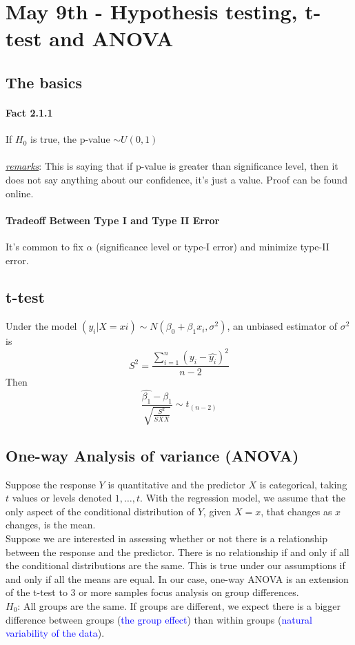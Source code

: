 \documentclass[11pt]{article}
\newcommand{\ti}[1]{\textit{#1}}
\newcommand{\under}[1]{\underline{#1}}
\begin{document}
\section{May 9th - Hypothesis testing, t-test and ANOVA}
\subsection{The basics}
\paragraph{Fact 2.1.1} If $H_0$ is true, the p-value $\sim U(0,1)$ \\\\
\under{\ti{remarks}}: This is saying that if p-value is greater than significance level, then it does not say anything about our confidence, it's just a value. Proof can be found online.
\paragraph{Tradeoff Between Type I and Type II Error}
It's common to fix $\alpha$ (significance level or type-I error) and minimize type-II error.
\subsection{t-test}
Under the model $(y_i|X=xi) \sim N(\beta_0 + \beta_1 x_i, \sigma^2)$, an unbiased estimator of $\sigma^2$ is 
$$S^2 = \frac{\sum_{i=1}^n(y_i-\hat{y_i})^2}{n-2} $$
Then
$$ \frac{\hat{\beta_1} - \beta_1}{\sqrt{\frac{S^2}{SXX}}} \sim t_{(n-2)}$$


\subsection{One-way Analysis of variance (ANOVA)}
Suppose the response $Y$ is quantitative and the predictor $X$ is categorical, taking $t$ values or levels denoted $1, \hdots, t$. With the regression model, we assume that the only aspect of the conditional distribution of $Y$, given $X = x$, that changes as $x$ changes, is the mean. \\
Suppose we are interested in assessing whether or not there is a relationship between the response and the predictor. There is no relationship if and only if all the conditional distributions are the same. This is true under our assumptions if and only if all the means are equal.
In our case, one-way ANOVA is an extension of the t-test to 3 or more samples focus analysis on group differences.\\
$H_0$: All groups are the same.
If groups are different, we expect there is a bigger difference between groups (\textcolor{blue}{the group effect}) than within groups (\textcolor{blue}{natural variability of the data}).
\end{document}
